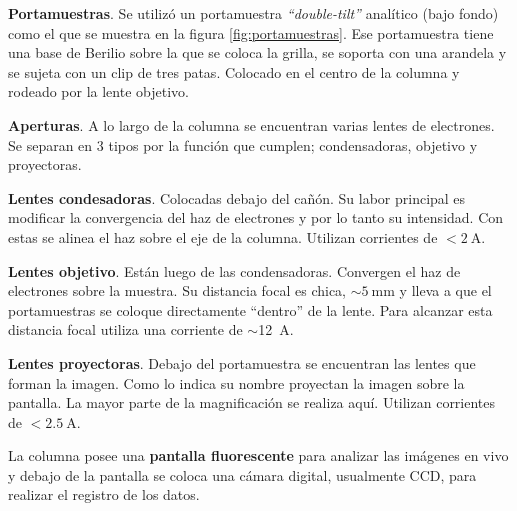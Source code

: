\textbf{Portamuestras}. Se utilizó un portamuestra \textit{``double-tilt''} analítico (bajo fondo) como el que se muestra en la figura \ref{fig:portamuestras}. Ese portamuestra tiene una base de Berilio sobre la que se coloca la grilla, se soporta con una arandela y se sujeta con un clip de tres patas. Colocado en el centro de la columna y rodeado por la lente objetivo. %

\textbf{Aperturas}. A lo largo de la columna se encuentran varias lentes de electrones. Se separan en 3 tipos por la función que cumplen; condensadoras, objetivo y proyectoras. 

\textbf{Lentes condesadoras}.
Colocadas debajo del cañón. Su labor principal es modificar la convergencia del haz de electrones y por lo tanto su intensidad. Con estas se alinea el haz sobre el eje de la columna. Utilizan corrientes de \(< \qty{2}{\ampere}\).

\textbf{Lentes objetivo}.
Están luego de las condensadoras. Convergen el haz de electrones sobre la muestra. Su distancia focal es chica, \(\sim \qty{5}{\milli\meter}\) y lleva a que el portamuestras se coloque directamente ``dentro'' de la lente. Para alcanzar esta distancia focal utiliza una corriente de \(\sim\)\qty{12}{\ampere}. 

\textbf{Lentes proyectoras}.
Debajo del portamuestra se encuentran las lentes que forman la imagen. Como lo indica su nombre proyectan la imagen sobre la pantalla. La mayor parte de la magnificación se realiza aquí. Utilizan corrientes de \(< \qty{2.5}{\ampere}\).

La columna posee una \textbf{pantalla fluorescente} para analizar las imágenes en vivo y debajo de la pantalla se coloca una cámara digital, usualmente CCD, para realizar el registro de los datos.



